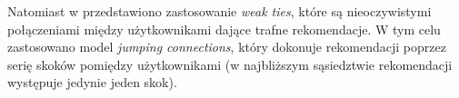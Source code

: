 Natomiast w \cite{weakTies} przedstawiono zastosowanie \textit{weak ties}, które są nieoczywistymi połączeniami między użytkownikami dające trafne rekomendacje. W tym celu zastosowano model \textit{jumping connections}, który dokonuje rekomendacji poprzez serię skoków pomiędzy użytkownikami (w najbliższym sąsiedztwie rekomendacji występuje jedynie jeden skok).

